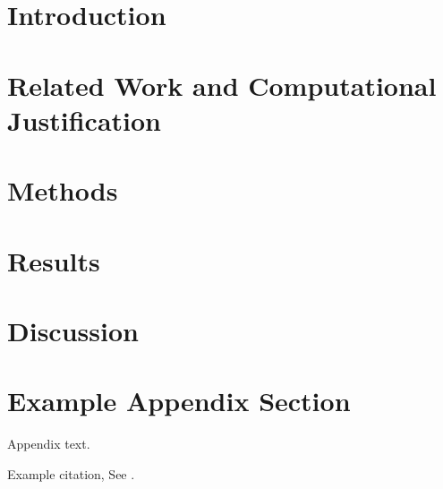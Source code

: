 \documentclass[preprint,12pt]{elsarticle}
\begin{document}


\section{Introduction}
\label{sec:intro}


\section{Related Work and Computational Justification}
\label{sec:rel_work}


\section{Methods}
\label{sec:methods}


\section{Results}
\label{sec:results}


\section{Discussion}
\label{sec:diss}


\appendix
\section{Example Appendix Section}
\label{app1}

Appendix text.

Example citation, See \citet{lamport94}.

\end{document}
